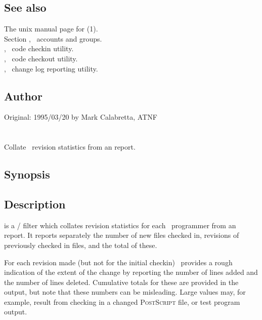 \subsection*{See also}
 
The unix manual page for (1).\\
Section , \aipspp\ accounts and groups.\\
, \aipspp\ code checkin utility.\\
, \aipspp\ code checkout utility.\\
, \aipspp\ change log reporting utility.
 
\subsection*{Author}
 
Original: 1995/03/20 by Mark Calabretta, ATNF


\newpage
\section{}
\label{astat}

Collate \aipspp\ revision statistics from an  report.

\subsection*{Synopsis}
 
\begin{synopsis}
\end{synopsis}
 
\subsection*{Description}
 
 is a / filter which collates revision
statistics for each \aipspp\ programmer from an  report.  It
reports separately the number of new files checked in, revisions of previously
checked in files, and the total of these.

For each revision made (but not for the initial checkin) \rcs\ provides a
rough indication of the extent of the change by reporting the number of lines
added and the number of lines deleted.  Cumulative totals for these are
provided in the output, but note that these numbers can be misleading.  Large
values may, for example, result from checking in a changed \textsc{PostScript}
file, or test program output.
 
